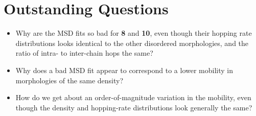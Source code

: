 \documentclass[12pt]{article}
\begin{document}
\clearpage

\section{Outstanding Questions}


\begin{itemize}
    \item{Why are the MSD fits so bad for \textbf{8} and \textbf{10}, even though their hopping rate distributions looks identical to the other disordered morphologies, and the ratio of intra- to inter-chain hops the same?}
    \item{Why does a bad MSD fit appear to correspond to a lower mobility in morphologies of the same density?}
    \item{How do we get about an order-of-magnitude variation in the mobility, even though the density and hopping-rate distributions look generally the same?}
\end{itemize}




\end{document}
